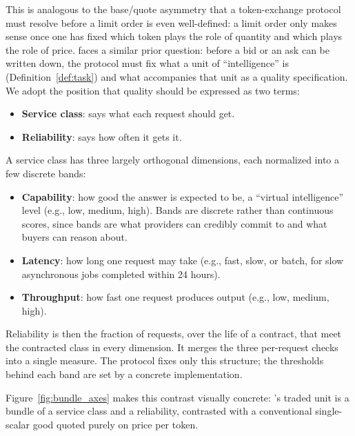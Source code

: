 This is analogous to the base/quote asymmetry that a token-exchange protocol
must resolve before a limit order is even well-defined: a limit order only
makes sense once one has fixed which token plays the role of quantity and which
plays the role of price. \Noesis{} faces a similar prior question: before a bid
or an ask can be written down, the protocol must fix what a unit of
``intelligence'' is (Definition~\ref{def:task}) and what accompanies that
unit as a quality specification. We adopt the position that quality should
be expressed as two terms:

\begin{itemize}
  \item \textbf{Service class}: says what each request should get.
  \item \textbf{Reliability}: says how often it gets it.
\end{itemize}

A service class has three largely orthogonal dimensions, each normalized
into a few discrete bands:

\begin{itemize}
  \item \textbf{Capability}: how good the answer is expected to be, a
    ``virtual intelligence'' level (e.g., low, medium, high). Bands are
    discrete rather than continuous scores, since bands are what providers
    can credibly commit to and what buyers can reason about.
  \item \textbf{Latency}: how long one request may take (e.g., fast, slow,
    or batch, for slow asynchronous jobs completed within 24 hours).
  \item \textbf{Throughput}: how fast one request produces output (e.g.,
    low, medium, high).
\end{itemize}

Reliability is then the fraction of requests, over the life of a contract,
that meet the contracted class in every dimension. It merges the three
per-request checks into a single measure. The protocol fixes only this
structure; the thresholds behind each band are set by a concrete
implementation.

Figure~\ref{fig:bundle_axes} makes this contrast visually concrete:
\Noesis{}'s traded unit is a bundle of a service class and a reliability,
contrasted with a conventional single-scalar good quoted purely on price per
token.

